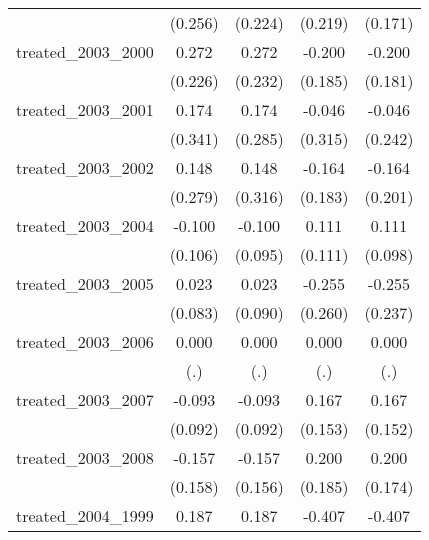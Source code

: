 {\begin{tabular}{l*{4}{c}}
            &     (0.256)         &     (0.224)         &     (0.219)         &     (0.171)         \\
[1em]
treated\_2003\_2000&       0.272         &       0.272         &      -0.200         &      -0.200         \\
            &     (0.226)         &     (0.232)         &     (0.185)         &     (0.181)         \\
[1em]
treated\_2003\_2001&       0.174         &       0.174         &      -0.046         &      -0.046         \\
            &     (0.341)         &     (0.285)         &     (0.315)         &     (0.242)         \\
[1em]
treated\_2003\_2002&       0.148         &       0.148         &      -0.164         &      -0.164         \\
            &     (0.279)         &     (0.316)         &     (0.183)         &     (0.201)         \\
[1em]
treated\_2003\_2004&      -0.100         &      -0.100         &       0.111         &       0.111         \\
            &     (0.106)         &     (0.095)         &     (0.111)         &     (0.098)         \\
[1em]
treated\_2003\_2005&       0.023         &       0.023         &      -0.255         &      -0.255         \\
            &     (0.083)         &     (0.090)         &     (0.260)         &     (0.237)         \\
[1em]
treated\_2003\_2006&       0.000         &       0.000         &       0.000         &       0.000         \\
            &         (.)         &         (.)         &         (.)         &         (.)         \\
[1em]
treated\_2003\_2007&      -0.093         &      -0.093         &       0.167         &       0.167         \\
            &     (0.092)         &     (0.092)         &     (0.153)         &     (0.152)         \\
[1em]
treated\_2003\_2008&      -0.157         &      -0.157         &       0.200         &       0.200         \\
            &     (0.158)         &     (0.156)         &     (0.185)         &     (0.174)         \\
[1em]
treated\_2004\_1999&       0.187         &       0.187         &      -0.407         &      -0.407         \\

\end{tabular}}
